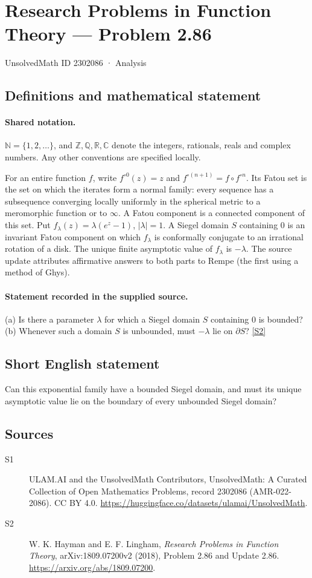 \documentclass[11pt]{article}
\newcommand{\sref}[2]{\hyperlink{source:#1:#2}{[S#2]}}
\begin{document}
\setcounter{section}{2302085}
\section{Research Problems in Function Theory — Problem 2.86}\label{2302086}
{\small\sffamily UnsolvedMath ID 2302086 · Analysis}
\subsection{Definitions and mathematical statement}

\paragraph{Shared notation.}$\mathbb N=\{1,2,\ldots\}$, and $\mathbb Z,\mathbb Q,\mathbb R,\mathbb C$ denote the integers, rationals, reals and complex numbers. Any other conventions are specified locally.


For an entire function $f$, write $f^{\circ0}(z)=z$ and $f^{\circ(n+1)}=f\circ f^{\circ n}$. Its Fatou set is the set on which the iterates form a normal family: every sequence has a subsequence converging locally uniformly in the spherical metric to a meromorphic function or to $\infty$. A Fatou component is a connected component of this set. Put $f_\lambda(z)=\lambda(e^z-1)$, $|\lambda|=1$. A Siegel domain $S$ containing $0$ is an invariant Fatou component on which $f_\lambda$ is conformally conjugate to an irrational rotation of a disk. The unique finite asymptotic value of $f_\lambda$ is $-\lambda$.
The source update attributes affirmative answers to both parts to Rempe (the first using a method of Ghys).
\paragraph{Statement recorded in the supplied source.}
(a) Is there a parameter $\lambda$ for which a Siegel domain $S$ containing $0$ is bounded? (b) Whenever such a domain $S$ is unbounded, must $-\lambda$ lie on $\partial S$? \sref{2302086}{2}
\subsection{Short English statement}
Can this exponential family have a bounded Siegel domain, and must its unique asymptotic value lie on the boundary of every unbounded Siegel domain?
\subsection{Sources}
\begin{description}
\item[\hypertarget{source:2302086:1}{S1}] ULAM.AI and the UnsolvedMath Contributors, UnsolvedMath: A Curated Collection of Open Mathematics Problems, record 2302086 (AMR-022-2086). CC BY 4.0. \url{https://huggingface.co/datasets/ulamai/UnsolvedMath}.
\item[\hypertarget{source:2302086:2}{S2}] W. K. Hayman and E. F. Lingham, \emph{Research Problems in Function Theory}, arXiv:1809.07200v2 (2018), Problem 2.86 and Update 2.86. \url{https://arxiv.org/abs/1809.07200}.
\end{description}
\label{end:2302086}
\end{document}
